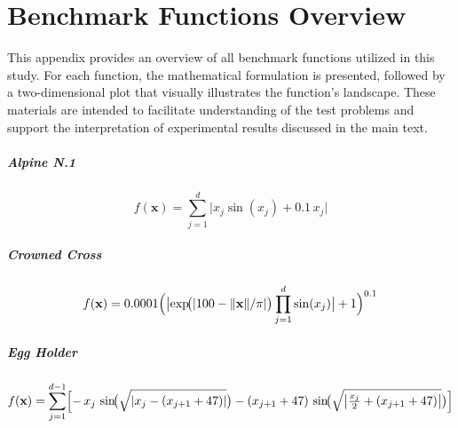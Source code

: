 \chapter{Benchmark Functions Overview}\label{app:benchmarks_formulas}

This appendix provides an overview of all benchmark functions utilized in this study. For each function, the mathematical formulation is presented, followed by a two-di\-men\-sional plot that visually illustrates the function’s landscape. These materials are intended to facilitate understanding of the test problems and support the interpretation of experimental results discussed in the main text.

\paragraph{Alpine N.1}
\begin{equation}
f(\mathbf{x})
= \sum_{j=1}^{d} \bigl| x_j \sin(x_j) + 0.1\,x_j \bigr|
\label{ben:alpine}
\end{equation}

\vspace{.095em}
\paragraph*{Crowned Cross}
\begin{equation}
f(\mathbf{x})
=0.0001\Bigl(\bigl|\exp\!\bigl(\lvert100-\|\mathbf{x}\|/\pi\rvert\bigr)\prod_{j=1}^d\sin(x_j)\bigr|+1\Bigr)^{0.1}
\label{ben:crowned_cross}
\end{equation}

\vspace{.095em}
\paragraph{Egg Holder}
\begin{equation}
f(\mathbf{x})
= \sum_{j=1}^{d-1}\Bigl[
    -\,x_{j}\,\sin\!\bigl(\sqrt{\lvert x_{j} - (x_{j+1}+47)\rvert}\bigr)
- (x_{j+1}+47)\,\sin\!\bigl(\sqrt{\bigl\lvert \tfrac{x_{j}}{2} + (x_{j+1}+47)\bigr\rvert}\bigr)
\Bigr]
\label{ben:eggHolder}
\end{equation}

\vspace{.095em}
